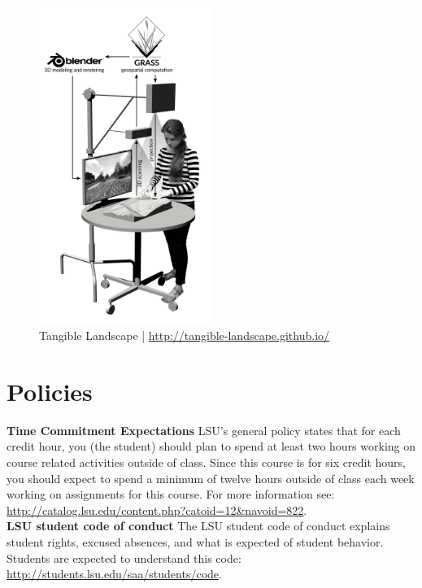 \documentclass[11pt,article,oneside]{memoir}
\begin{document}

\begin{figure}[H]
\begin{center}
\includegraphics[width=0.5\textwidth]{../images/rendered_diagram_2.png}
\caption{Tangible Landscape | \url{http://tangible-landscape.github.io/}}
\label{fig:tangible_landscape}
\end{center}
\end{figure}

\clearpage

\section{Policies}

\noindent \textbf{Time Commitment Expectations}
LSU's general policy states that for each credit hour, you (the student) should plan to
spend at least two hours working on course related activities outside of class. Since this course is for six credit hours, you should expect to spend a minimum of twelve hours outside of class each week working on assignments for this course. For more information see: 
\url{http://catalog.lsu.edu/content.php?catoid=12&navoid=822}.\\

\noindent \textbf{LSU student code of conduct}
The LSU student code of conduct explains student rights, excused absences, and what is expected of student behavior. Students are expected to understand this code:  \url{http://students.lsu.edu/saa/students/code}.\\ %
\end{document}
